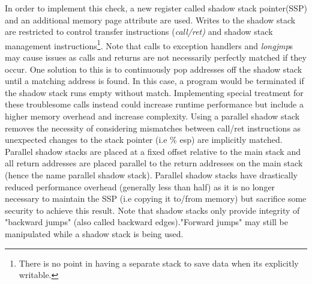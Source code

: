 \documentclass[10pt,twocolumn,a4paper]{article}
\begin{document}
In order to implement this check, a new register called shadow stack pointer(SSP) and an additional memory page attribute are used.
Writes to the shadow stack are restricted to control transfer instructions (\emph{call/ret)} and shadow stack management instructions\footnote{There is no point in having a separate stack to save data when its explicitly writable.}\cite{CFE}.
Note that calls to exception handlers and \emph{longjmp}s may cause issues as calls and returns are not necessarily perfectly matched if they occur\cite{light}.
One solution to this is to continuously pop addresses off the shadow stack until a matching address is found. In this case, a program would be terminated if the shadow stack runs empty without match.
Implementing special treatment for these troublesome calls instead could increase runtime performance but include a higher memory overhead and increase complexity.
Using a parallel shadow stack removes the necessity of considering mismatches between call/ret instructions as unexpected changes to the stack pointer (i.e \% esp) are implicitly matched\cite{performance}.
Parallel shadow stacks are placed at a fixed offset relative to the main stack and all return addresses are placed parallel to the return addresses on the main stack (hence the name parallel shadow stack). 
Parallel shadow stacks have drastically reduced performance overhead (generally less than half) as it is no longer necessary to maintain the SSP (i.e copying it to/from memory) but sacrifice some security to achieve this result\cite{performance}.
Note that shadow stacks only provide integrity of "backward jumps" (also called backward edges)."Forward jumps" may still be manipulated while a shadow stack is being used.
\end{document}
